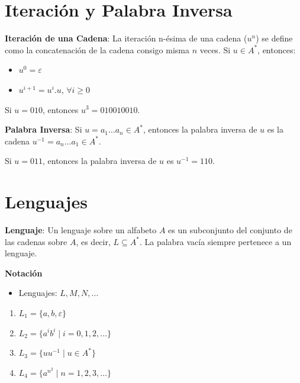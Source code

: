 \documentclass[12pt]{book} %
\begin{document}
\hypertarget{iteraciuxf3n-y-palabra-inversa}{%
\section{Iteración y Palabra
Inversa}\label{iteraciuxf3n-y-palabra-inversa}}

\begin{definicion}
\textbf{Iteración de una Cadena}: La iteración n-ésima de una cadena ($u^n$) se define como la concatenación de la cadena consigo misma $n$ veces.  
Si $u \in A^*$, entonces:  
\begin{itemize}
    \item $u^0 = \varepsilon$  
    \item $u^{i+1} = u^i.u$, $\forall i \geq 0$  
\end{itemize}
\end{definicion}

\begin{ejemplo}
Si $u = 010$, entonces $u^3 = 010010010$.
\end{ejemplo}

\begin{definicion}
\textbf{Palabra Inversa}: Si $u = a_1 \ldots a_n \in A^*$, entonces la palabra inversa de $u$ es la cadena $u^{-1} = a_n \ldots a_1 \in A^*$.  
\end{definicion}

\begin{ejemplo}
Si $u = 011$, entonces la palabra inversa de $u$ es $u^{-1} = 110$.
\end{ejemplo}

\hypertarget{lenguajes}{%
\section{Lenguajes}\label{lenguajes}}

\begin{definicion}
\textbf{Lenguaje}: Un lenguaje sobre un alfabeto $A$ es un subconjunto del conjunto de las cadenas sobre $A$, es decir, $L \subseteq A^*$.  
La palabra vacía siempre pertenece a un lenguaje.
\end{definicion}

\textbf{Notación}\\

\begin{itemize}
    \item Lenguajes: $L, M, N, \ldots$
\end{itemize}

\begin{ejemplo}
    \begin{enumerate}
        \item $L_1 = \{a, b, \varepsilon\}$  
        \item $L_2 = \{a^i b^i \mid i = 0, 1, 2, \ldots\}$  
        \item $L_3 = \{u u^{-1} \mid u \in A^*\}$  
        \item $L_4 = \{a^{n^2} \mid n = 1, 2, 3, \ldots\}$  
    \end{enumerate}
\end{ejemplo}
\end{document}
